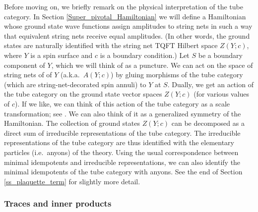 Before moving on, we briefly remark on the physical interpretation of the tube category. 
In Section \ref{Super_pivotal_Hamiltonian} we will define a Hamiltonian whose ground state wave functions assign amplitudes to string nets in such a way
that equivalent string nets receive equal amplitudes.
(In other words, the ground states are naturally identified with the string net TQFT Hilbert space $Z(Y; c)$,
where $Y$ is a spin surface and $c$ is a boundary condition.)
Let $S$ be a boundary component of $Y$, which we will think of as a puncture.
We can act on the space of string nets of of $Y$ (a.k.a.\ $A(Y; c)$) by gluing morphisms of the tube category 
(which are string-net-decorated spin annuli)
to $Y$ at $S$.
Dually, we get an action of the tube category on the ground state vector spaces $Z(Y; c)$ (for various values of $c$).
If we like, we can think of this action of the tube category as a scale transformation; see \cite{Lan2014}.
We can also think of it as a generalized symmetry of the Hamiltonian.
The collection of ground states $Z(Y; c)$ can be decomposed as a direct sum of irreducible representations of the tube category.
The irreducible representations of the tube category are thus identified with the elementary particles (i.e.\ anyons) of the theory.
Using the usual correspondence between minimal idempotents and irreducible representations, we can also identify
the minimal idempotents of the tube category with anyons.
See the end of Section \ref{ss_plaquette_term} for slightly more detail.





\subsubsection{Traces and inner products} \label{traces_and_innerproducts}


